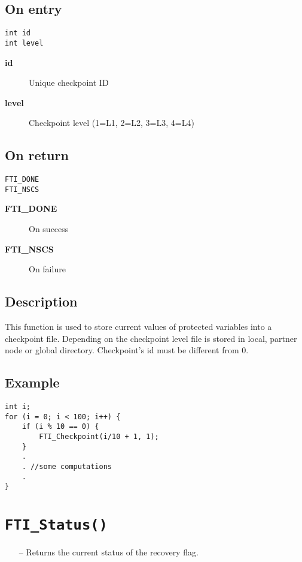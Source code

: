 \documentclass{refrep}
\begin{document}
\subsection*{On entry}
\begin{lstlisting}[frame=single]
int id
int level
\end{lstlisting}
\begin{description}
\item[\textbf{id}] Unique checkpoint ID
\item[\textbf{level}] Checkpoint level (1=L1, 2=L2, 3=L3, 4=L4)
\end{description}
\subsection*{On return}
\begin{lstlisting}[frame=single]
FTI_DONE
FTI_NSCS
\end{lstlisting}
\begin{description}
\item[\textbf{FTI\_DONE}] On success
\item[\textbf{FTI\_NSCS}] On failure
\end{description}
\subsection*{Description}
This function is used to store current values of protected variables into a checkpoint file. Depending on the checkpoint level file is stored in local, partner node or global directory. Checkpoint's id must be different from 0.
\subsection*{Example}
\begin{center}
\begin{lstlisting}[frame=single]
int i;
for (i = 0; i < 100; i++) {
    if (i % 10 == 0) {
        FTI_Checkpoint(i/10 + 1, 1);
    }
    .
    . //some computations
    .
}
\end{lstlisting}
\end{center}
\newpage
\section{\tt FTI\_Status()}\label{sec:ftistatus}
\begin{framed}
\begin{itemize}
\item[--] Returns the current status of the recovery flag.
\end{itemize}
\end{framed}
\end{document}
